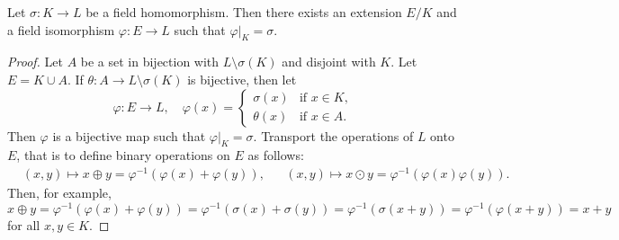 


\begin{lemma}
\label{lem:exists_bijective}
	Let $\sigma\colon K\to L$ be a field homomorphism. Then there exists an extension
	$E/K$ and a field isomorphism $\varphi\colon E\to L$
	such that $\varphi|_K=\sigma$. 
\end{lemma}

\begin{proof}
	Let $A$ be a set in bijection with $L\setminus\sigma(K)$ and disjoint with $K$. 
	Let $E=K\cup A$. If $\theta\colon A\to L\setminus\sigma(K)$ is bijective, then 
	let 
	\[
		\varphi\colon E\to L,
		\quad
		\varphi(x)=\begin{cases}
			\sigma(x) & \text{if $x\in K$},\\
			\theta(x) & \text{if $x\in A$}.
		\end{cases}
	\]
	Then $\varphi$ is a bijective map such that $\varphi|_K=\sigma$. 
	Transport the operations of $L$ onto $E$, that is 
	to define binary operations on $E$ as follows: 
	\begin{align*}
		&(x,y)\mapsto x\oplus y=\varphi^{-1}(\varphi(x)+\varphi(y)), && 
		(x,y)\mapsto x\odot y=\varphi^{-1}(\varphi(x)\varphi(y)).
	\end{align*}
	Then, for example, 
	\[
		x\oplus y=\varphi^{-1}(\varphi(x)+\varphi(y))=\varphi^{-1}(\sigma(x)+\sigma(y))
		=\varphi^{-1}(\sigma(x+y))=\varphi^{-1}(\varphi(x+y))=x+y
	\]
	for all $x,y\in K$. 
\end{proof}

